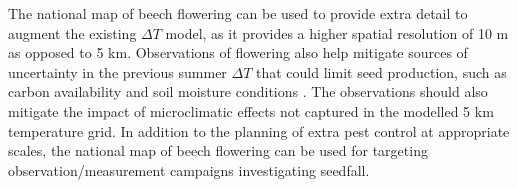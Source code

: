 \documentclass[remotesensing,article,submit,moreauthors,pdftex]{Definitions/mdpi}
\begin{document}
The national map of beech flowering can be used to provide extra detail to augment the existing $\Delta{T}$ model, as it
provides a higher spatial resolution of 10 m as opposed to 5 km. Observations of flowering also help mitigate sources of
uncertainty in the previous summer $\Delta{T}$ that could limit seed production, such as carbon availability and soil
moisture conditions \citep{Uscoe2005}. The observations should also mitigate the impact of microclimatic effects not
captured in the modelled 5 km temperature grid. In addition to the planning of extra pest control at appropriate scales,
the national map of beech flowering can be used for targeting observation/measurement campaigns investigating
seedfall.  

\end{document}
